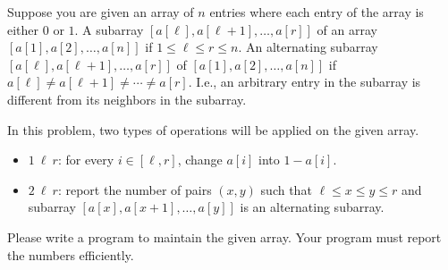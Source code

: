 Suppose you are given an array of $n$ entries
where each entry of the array is either $0$ or $1$.
A subarray $[a[\ell],a[\ell+1],\dots,a[r]]$ of an array
$[a[1], a[2], \dots, a[n]]$ if $1\le \ell \le r\le n$.
An alternating subarray $[a[\ell],a[\ell+1],\dots,a[r]]$ of 
$[a[1], a[2], \dots, a[n]]$
if $a[\ell]\neq a[\ell+1]\neq \cdots \neq a[r]$. I.e., an arbitrary entry
in the subarray is different from its neighbors in the subarray.

In this problem, two types of operations will be applied on the given array.
\begin{itemize}
\item $1~\ell~r$: for every $i\in[\ell,r]$, change $a[i]$ into $1-a[i]$.
\item $2~\ell~r$: report the number of pairs $(x, y)$ such that 
$\ell \leq x \leq y \leq r$ and subarray 
$[a[x],a[x+1],\dots,a[y]]$ is an alternating subarray.
\end{itemize}

Please write a program to maintain the given array.
Your program must report the numbers efficiently.
